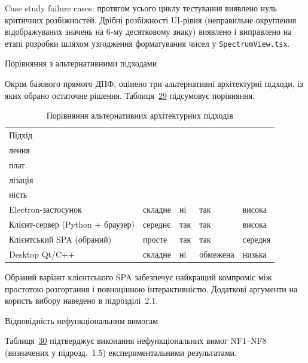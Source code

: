 Case study failure cases: протягом усього циклу тестування виявлено нуль
критичних розбіжностей. Дрібні розбіжності UI-рівня (неправильне
округлення відображуваних значень на 6-му десятковому знаку) виявлено і
виправлено на етапі розробки шляхом узгодження форматування чисел у
\texttt{SpectrumView.tsx}.

Порівняння з альтернативними підходами

Окрім базового прямого ДПФ, оцінено три альтернативні архітектурні
підходи, із яких обрано остаточне рішення.
Таблиця~\hyperref[tab:alternatives]{29} підсумовує порівняння.

\begin{longtable}[]{@{}
  >{\raggedright\arraybackslash}p{}
  >{\raggedright\arraybackslash}p{}
  >{\raggedright\arraybackslash}p{}
  >{\raggedright\arraybackslash}p{}
  >{\raggedright\arraybackslash}p{}@{}}
\caption{\protect{}\label{tab:alternatives}{}Порівняння
альтернативних архітектурних підходів}\tabularnewline
\toprule\noalign{}
\endfirsthead
\endhead
\bottomrule\noalign{}
\endlastfoot
Підхід & & & & \\
лення & & & & \\
плат. & & & & \\
лізація & & & & \\
ність & & & & \\
Electron-застосунок & складне & ні & так & висока \\
Клієнт-сервер (Python + браузер) & середнє & так & так & висока \\
Клієнтський SPA (обраний) & просте & так & так & середня \\
Desktop Qt/C++ & складне & ні & обмежена & низька \\
\end{longtable}

Обраний варіант клієнтського SPA забезпечує найкращий компроміс між
простотою розгортання і повноцінною інтерактивністю. Додаткові аргументи
на користь вибору наведено в підрозділі~2.1.

Відповідність нефункціональним вимогам

Таблиця~\hyperref[tab:nf_verify]{30} підтверджує виконання
нефункціональних вимог NF1--NF8 (визначених у підрозд.~1.5)
експериментальними результатами.

